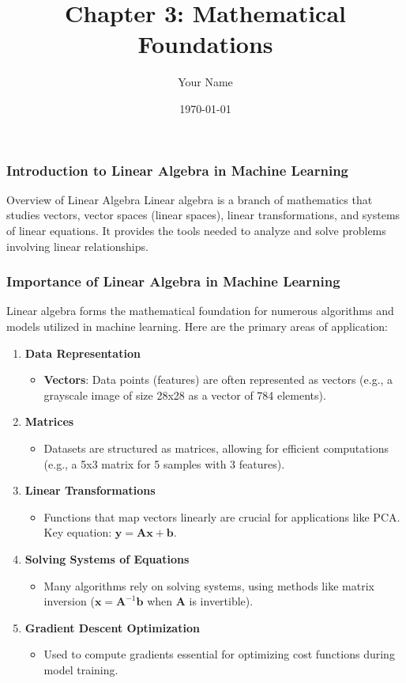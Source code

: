 \documentclass{beamer}
\title{Chapter 3: Mathematical Foundations}
\author{Your Name}
\institute{Your Institution}
\date{\today}
\begin{document}
\frame{\titlepage}

\begin{frame}[fragile]
    \frametitle{Introduction to Linear Algebra in Machine Learning}
    \begin{block}{Overview of Linear Algebra}
        Linear algebra is a branch of mathematics that studies vectors, vector spaces (linear spaces), linear transformations, and systems of linear equations. It provides the tools needed to analyze and solve problems involving linear relationships.
    \end{block}
\end{frame}

\begin{frame}[fragile]
    \frametitle{Importance of Linear Algebra in Machine Learning}
    Linear algebra forms the mathematical foundation for numerous algorithms and models utilized in machine learning. Here are the primary areas of application:
    \begin{enumerate}
        \item \textbf{Data Representation}
        \begin{itemize}
            \item \textbf{Vectors}: Data points (features) are often represented as vectors (e.g., a grayscale image of size 28x28 as a vector of 784 elements).
        \end{itemize}
        
        \item \textbf{Matrices}
        \begin{itemize}
            \item Datasets are structured as matrices, allowing for efficient computations (e.g., a 5x3 matrix for 5 samples with 3 features).
        \end{itemize}
        
        \item \textbf{Linear Transformations}
        \begin{itemize}
            \item Functions that map vectors linearly are crucial for applications like PCA. Key equation: \( \mathbf{y} = \mathbf{Ax} + \mathbf{b} \).
        \end{itemize}
        
        \item \textbf{Solving Systems of Equations}
        \begin{itemize}
            \item Many algorithms rely on solving systems, using methods like matrix inversion (\( \mathbf{x} = \mathbf{A}^{-1}\mathbf{b} \) when \( \mathbf{A} \) is invertible).
        \end{itemize}
        
        \item \textbf{Gradient Descent Optimization}
        \begin{itemize}
            \item Used to compute gradients essential for optimizing cost functions during model training.
        \end{itemize}
    \end{enumerate}
\end{frame}
\end{document}
